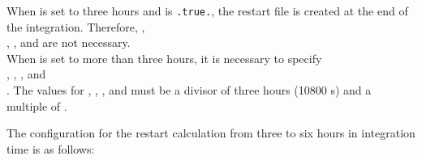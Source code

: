\begin{enumerate}
When  is set to three hours and  is \verb|.true.|, the restart file is created at the end of the integration. Therefore, , \\
, , and  are not necessary.\\
When  is set to more than three hours, it is necessary to specify \\
, , , and \\
.
The values for , , , and  must be a divisor of three hours (10800 s) and a multiple of .


The configuration for the restart calculation from three to six hours in integration time is as follows:\\


\end{enumerate}
